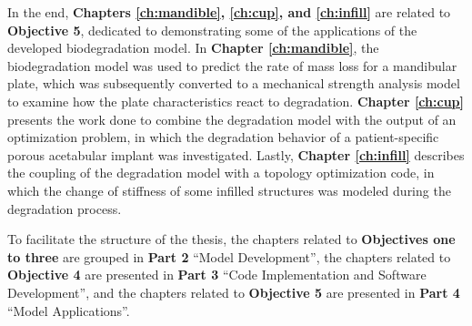 In the end, \textbf{Chapters \ref{ch:mandible}, \ref{ch:cup}, and \ref{ch:infill}} are related to \textbf{Objective 5}, dedicated to demonstrating some of the applications of the developed biodegradation model. In \textbf{Chapter \ref{ch:mandible}}, the biodegradation model was used to predict the rate of mass loss for a mandibular plate, which was subsequently converted to a mechanical strength analysis model to examine how the plate characteristics react to degradation. \textbf{Chapter \ref{ch:cup}} presents the work done to combine the degradation model with the output of an optimization problem, in which the degradation behavior of a patient-specific porous acetabular implant was investigated. Lastly, \textbf{Chapter \ref{ch:infill}} describes the coupling of the degradation model with a topology optimization code, in which the change of stiffness of some infilled structures was modeled during the degradation process.

To facilitate the structure of the thesis, the chapters related to \textbf{Objectives one to three} are grouped in \textbf{Part 2} ``Model Development'', the chapters related to \textbf{Objective 4} are presented in \textbf{Part 3} ``Code Implementation and Software Development'', and the chapters related to \textbf{Objective 5} are presented in \textbf{Part 4} ``Model Applications''.

\cleardoublepage
